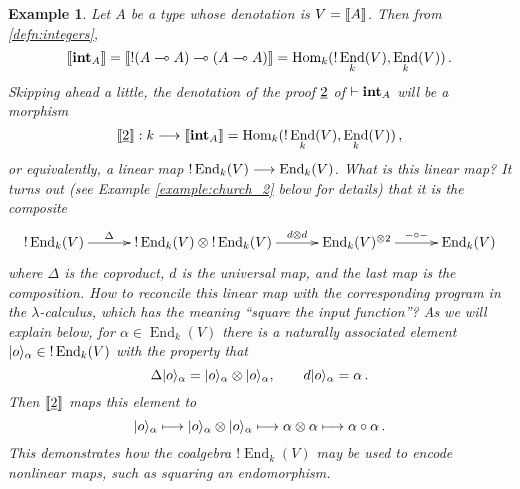 \documentclass[english,letter paper,12pt,reqno]{article}
\DeclarePairedDelimiter\ket{\lvert}{\rangle}
\theoremstyle{example}
\newtheorem{example}[theorem]{Example}
\numberwithin{equation}{section}
\def\Hom{\operatorname{Hom}}
\DeclareMathOperator{\End}{End}
\def\inta{\bold{int}}
\begin{document}
\begin{example}\label{example:denotation_2}  Let $A$ be a type whose denotation is $V = \llbracket A \rrbracket$. Then from \eqref{defn:integers},
\[
\den{\inta_A} = \den{ {!}( A \multimap A) \multimap (A \multimap A)} = \Hom_k( {!} \End_k(V), \End_k(V) )\,.
\]
Skipping ahead a little, the denotation of the proof $\underline{2}$ of $\vdash \inta_A$ will be a morphism
\begin{equation}\label{eq:2_as_comp_0}
\den{\prf{2}}: k \lto \den{\inta_A} = \Hom_k( {!} \End_k(V), \End_k(V) )\,,
\end{equation}
or equivalently, a linear map ${!} \End_k(V) \lto \End_k(V)$. What is this linear map? It turns out (see Example \ref{example:church_2} below for details) that it is the composite
\begin{equation}\label{eq:2_as_comp}
\xymatrix@C+0.5pc{
{!} \End_k(V) \ar[r]^-{\Delta} & {!} \End_k(V) \otimes {!} \End_k(V) \ar[r]^-{d \otimes d} & \End_k(V)^{\otimes 2} \ar[r]^-{- \circ -} & \End_k(V)
}
\end{equation}
where $\Delta$ is the coproduct, $d$ is the universal map, and the last map is the composition. How to reconcile this linear map with the corresponding program in the $\lambda$-calculus, which has the meaning ``square the input function''? As we will explain below, for $\alpha \in \End_k( V )$ there is a naturally associated element $\ket{o}_\alpha \in {!} \End_k(V)$ with the property that
\[
\Delta \ket{o}_\alpha = \ket{o}_\alpha \otimes \ket{o}_\alpha, \qquad d \ket{o}_\alpha = \alpha\,.
\]
Then $\llbracket \underline{2} \rrbracket$ maps this element to
\begin{equation}\label{eq:2_deals_with_0}
\ket{o}_\alpha \longmapsto \ket{o}_\alpha \otimes \ket{o}_\alpha \longmapsto \alpha \otimes \alpha \longmapsto \alpha \circ \alpha\,.
\end{equation}
This demonstrates how the coalgebra ${!} \End_k(V)$ may be used to encode nonlinear maps, such as squaring an endomorphism.
\end{example}
\end{document}
